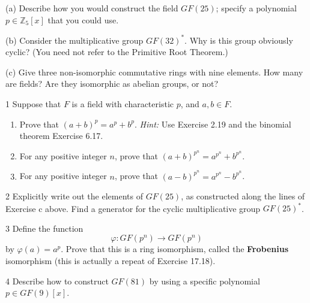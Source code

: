 \begin{problem}[Warmup]{(a)}
    Describe how you would construct the field $GF(25)$; specify a polynomial $p \in \mathbb{Z}_5[x]$ that you could use.
\end{problem}
\unsolved

\begin{problem}[Warmup]{(b)}
    Consider the multiplicative group $GF(32)^*$. Why is this group obviously cyclic? (You need not refer to the Primitive Root Theorem.)
\end{problem}
\unsolved

\begin{problem}[Warmup]{(c)}
    Give three non-isomorphic commutative rings with nine elements. How many are fields? Are they isomorphic as abelian groups, or not?
\end{problem}
\unsolved

\begin{problem}{1}
    Suppose that $F$ is a field with characteristic $p$, and $a, b \in F$.
    \begin{enumerate}
        \item[(a)] Prove that ${(a + b)}^p = a^p + b^p$. \emph{Hint:} Use Exercise 2.19 and
        the binomial theorem Exercise 6.17.
        \item[(b)] For any positive integer $n$, prove that
        ${(a + b)}^{p^n} = a^{p^n} + b^{p^n}$.
        \item[(c)] For any positive integer $n$, prove that
        ${(a - b)}^{p^n} = a^{p^n} - b^{p^n}$.
    \end{enumerate}
\end{problem}
\unsolved

\begin{problem}{2}
    Explicitly write out the elements of $GF(25)$, as constructed along the lines of
    Exercise c above. Find a generator for the cyclic multiplicative group $GF(25)^*$.
\end{problem}
\unsolved

\begin{problem}{3}
    Define the function
    \[\varphi : GF(p^n) \to GF(p^n)\]
    by $\varphi(a) = a^p$. Prove that this is a ring isomorphism, called the
    \textbf{Frobenius} isomorphism (this is actually a repeat of Exercise 17.18).
\end{problem}
\unsolved

\begin{problem}{4}
    Describe how to construct $GF(81)$ by using a specific polynomial
    $p \in GF(9)[x]$.
\end{problem}
\unsolved

